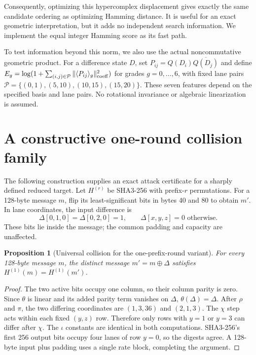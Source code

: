 \documentclass[11pt]{article}
\newtheorem{proposition}{Proposition}
\begin{document}
Consequently, optimizing this hypercomplex displacement gives exactly the same candidate ordering as optimizing Hamming distance. It is useful for an exact geometric interpretation, but it adds no independent search information. We implement the equal integer Hamming score as its fast path.

To test information beyond this norm, we also use the actual noncommutative geometric product. For a difference state $D$, set $P_{ij}=Q(D_i)\overline{Q(D_j)}$ and define $E_g=\log(1+\sum_{(i,j)\in\mathcal P}\|\langle P_{ij}\rangle_g\|_{\rm coeff}^2)$ for grades $g=0,\ldots,6$, with fixed lane pairs $\mathcal P=\{(0,1),(5,10),(10,15),(15,20)\}$. These seven features depend on the specified basis and lane pairs. No rotational invariance or algebraic linearization is assumed.

\section{A constructive one-round collision family}

The following construction supplies an exact attack certificate for a sharply defined reduced target. Let $H^{(r)}$ be SHA3-256 with prefix-$r$ permutations. For a 128-byte message $m$, flip its least-significant bits in bytes 40 and 80 to obtain $m'$. In lane coordinates, the input difference is
\begin{equation}
\Delta[0,1,0]=\Delta[0,2,0]=1,
\qquad\Delta[x,y,z]=0\text{ otherwise}.
\label{eq:delta}
\end{equation}
These bits lie inside the message; the common padding and capacity are unaffected.

\begin{proposition}[Universal collision for the one-prefix-round variant]
For every 128-byte message $m$, the distinct message $m'=m\oplus\Delta$ satisfies $H^{(1)}(m)=H^{(1)}(m')$.
\end{proposition}
\begin{proof}
The two active bits occupy one column, so their column parity is zero. Since $\theta$ is linear and its added parity term vanishes on $\Delta$, $\theta(\Delta)=\Delta$. After $\rho$ and $\pi$, the two differing coordinates are $(1,3,36)$ and $(2,1,3)$. The $\chi$ step acts within each fixed $(y,z)$ row. Therefore only rows with $y=1$ or $y=3$ can differ after $\chi$. The $\iota$ constants are identical in both computations. SHA3-256's first 256 output bits occupy four lanes of row $y=0$, so the digests agree. A 128-byte input plus padding uses a single rate block, completing the argument.
\end{proof}
\end{document}
